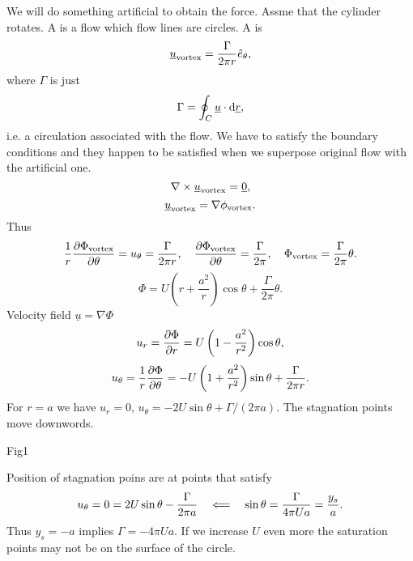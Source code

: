 \documentclass[11pt,oneside]{book}
\renewcommand{\vec}[1]{\underline{#1}}
\theoremstyle{definition} %
\theoremstyle{plain} %
\theoremstyle{remark} %
\theoremstyle{underline}
\begin{document}
  We will do something artificial to obtain the force.
  Assme that the cylinder rotates.
  A  is a flow which flow lines are circles.
  A  is 
  \begin{displaymath}
    \vec u_{\tm{vortex}} = \frac{\Gamma}{2 \pi r} \hat{e}_\theta,
  \end{displaymath}
  where $\Gamma$ is just 
  \begin{displaymath}
    \Gamma = \oint_C \vec u \cdot \d \vec r,
  \end{displaymath}
  i.e. a circulation associated with the flow.
  We have to satisfy the boundary conditions and they happen to be satisfied when we superpose original flow with 
  the artificial one.
  \begin{displaymath}
    \nabla \times \vec u_{\tm{vortex}} = \vec 0,
  \end{displaymath}
  \begin{displaymath}
    \vec u_{\tm{vortex}} = \nabla \phi_{\tm{vortex}}.
  \end{displaymath}
  Thus
  \begin{displaymath}
    \frac{1}{r} \frac{\partial \Phi_{\textrm{vortex}}}{\partial \theta} = u_\theta = \frac{\Gamma}{2 \pi r}, \quad
    \frac{\partial \Phi_{\textrm{vortex}}}{\partial \theta} = \frac{\Gamma}{2\pi}, \quad \Phi_{\textrm{vortex}} = \frac{\Gamma}{2\pi}\theta.
  \end{displaymath}
  \begin{displaymath}
    \Phi = U \left( r+ \frac{a^2}{r}  \right) \cos \theta + \frac{\Gamma}{2\pi}\theta.
  \end{displaymath}
  Velocity field $\vec u = \nabla \Phi$
  \begin{displaymath}
    u_r = \frac{\partial \Phi}{\partial r} = U \left( 1 - \frac{a^2}{r^2} \right) \cos \theta,
  \end{displaymath}
  \begin{displaymath}
    u_\theta = \frac{1}{r} \frac{\partial \Phi}{\partial \theta} = - U \left( 1 + \frac{a^2}{r^2} \right) \sin \theta + \frac{\Gamma}{2\pi r}.
  \end{displaymath}
  For $r = a$ we have $u_r = 0$, $u_\theta = - 2 U \sin \theta + \Gamma/(2 \pi a)$.
  The stagnation points move downwords.

  \todo Fig1
  
  Position of stagnation poins are at points that satisfy
  \begin{displaymath}
    u_\theta = 0 = 2 U \sin \theta - \frac{\Gamma}{2 \pi a} \quad \Longleftarrow \quad \sin \theta = \frac{\Gamma}{4\pi U a} = \frac{y_s}{a}.
  \end{displaymath}
  Thus $y_s = - a $ implies $\Gamma = - 4 \pi U a$.
  If we increase $U$ even more the saturation points may not be on the surface of the circle.
  
\end{document}
